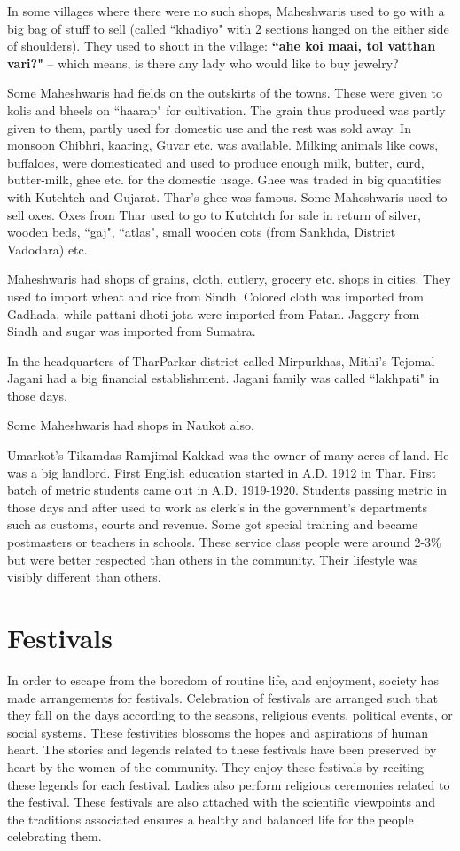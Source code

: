 In some villages where there were no such shops, Maheshwaris used to go with a
big bag of stuff to sell (called ``khadiyo" with 2 sections hanged on the either
side of shoulders). They used to shout in the village: \textbf{``ahe koi maai,
tol vatthan vari?"} -- which means, is there any lady who would like to buy
jewelry?

Some Maheshwaris had fields on the outskirts of the towns. These were given to
kolis and bheels on ``haarap" for cultivation. The grain thus produced was
partly given to them, partly used for domestic use and the rest was sold away.
In monsoon Chibhri, kaaring, Guvar etc. was available. Milking animals like
cows, buffaloes, were domesticated and used to produce enough milk, butter,
curd, butter-milk, ghee etc. for the domestic usage. Ghee was traded in big
quantities with Kutchtch and Gujarat. Thar's ghee was famous. Some Maheshwaris
used to sell oxes. Oxes from Thar used to go to Kutchtch for sale in return of
silver, wooden beds, ``gaj", ``atlas", small wooden cots (from Sankhda, District
Vadodara) etc.

Maheshwaris had shops of grains, cloth, cutlery, grocery etc. shops in cities.
They used to import wheat and rice from Sindh. Colored cloth was imported from
Gadhada, while pattani dhoti-jota were imported from Patan. Jaggery from Sindh
and sugar was imported from Sumatra.

In the headquarters of TharParkar district called Mirpurkhas, Mithi's Tejomal
Jagani had a big financial establishment. Jagani family was called ``lakhpati"
in those days.

Some Maheshwaris had shops in Naukot also.

Umarkot's Tikamdas Ramjimal Kakkad was the owner of many acres of land. He was a
big landlord. First English education started in A.D. 1912 in Thar. First batch
of metric students came out in A.D. 1919-1920. Students passing metric  in those
days and after used to work as clerk's in the government's departments such as
customs, courts and revenue. Some got special training and became postmasters or
teachers in schools. These service class people were around 2-3\% but were
better respected than others in the community. Their lifestyle was visibly
different than others.
\section{Festivals}
In order to escape from the boredom of routine life, and enjoyment,  society has made
arrangements for festivals. Celebration of festivals are arranged such that they
fall on the days according to the seasons, religious events, political events,
or social systems. These festivities blossoms the hopes and aspirations of human
heart. The stories and legends related to these festivals have been preserved by
heart by the women of the community. They enjoy these festivals by reciting
these legends for each festival. Ladies also perform religious ceremonies
related to the festival. These festivals are also attached with the scientific
viewpoints and the traditions associated ensures a healthy and balanced life for
the people celebrating them. 

